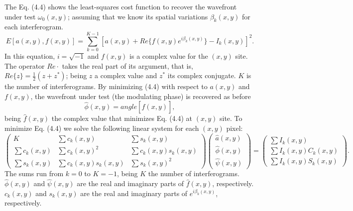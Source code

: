 The Eq. (4.4) shows the least-squares cost function to recover the wavefront
under test $\omega_0(x,y)$; assuming that we know its spatial variations
$\beta_k(x,y)$ for each interferogram.
\begin{equation}
  E[a(x,y),f(x,y)]=\sum_{k=0}^{K-1}[a(x,y) + Re\{f(x,y) e^{i\beta_k (x,y)} \} -
I_k (x,y)]^2.
\end{equation}
In this equation, $i = \sqrt{-1}$ and $f(x,y)$ is a complex value for the
$(x,y)$ site. The operator $Re{\cdot}$ takes the real part of its argument,
that is, $Re\{z\} = \frac{1}{2} (z+z^*)$; being $z$ a complex value and $z^*$
its complex conjugate. $K$ is the number of interferograms. By minimizing (4.4)
with respect to $a(x,y)$ and $f(x,y)$, the wavefront under test (the modulating
phase) is recovered as before 
\begin{equation}
 \hat{\phi}(x,y)=angle[\hat{f}(x,y)],
\end{equation}
being $\hat{f}(x,y)$ the complex value that minimizes Eq. (4.4) at $(x,y)$ site.
To minimize Eq. (4.4) we solve the following linear system for each $(x,y)$
pixel:
\begin{equation}
\left(\begin{array}{ccc}
K & \sum c_{k}(x,y) & \sum s_{k}(x,y)\\
\sum c_{k}(x,y) & \sum c_{k}(x,y)^{2} & \sum c_{k}(x,y)s_{k}(x,y)\\
\sum s_{k}(x,y) & \sum c_{k}(x,y)s_{k}(x,y) & \sum s_{k}(x,y)^{2}
\end{array}\right)\left(\begin{array}{c}
\hat{a}(x,y)\\
\hat{\phi}(x,y)\\
\hat{\psi}(x,y)
\end{array}\right)=\left(\begin{array}{c}
\sum I_{k}(x,y)\\
\sum I_{k}(x,y)C_{k}(x,y)\\
\sum I_{k}(x,y)S_{k}(x,y)
\end{array}\right).
\end{equation}
The sums run from $k = 0$ to $K=-1$, being $K$ the number of interferograms.
$\hat{\phi}(x,y)$ and $\hat{\psi}(x,y)$ are the real and imaginary parts of 
$\hat{f}(x,y)$, respectively. $c_k(x,y)$ and $s_k(x,y)$ are the real and
imaginary parts of $e^{i\beta_k(x,y)}$, respectively.

